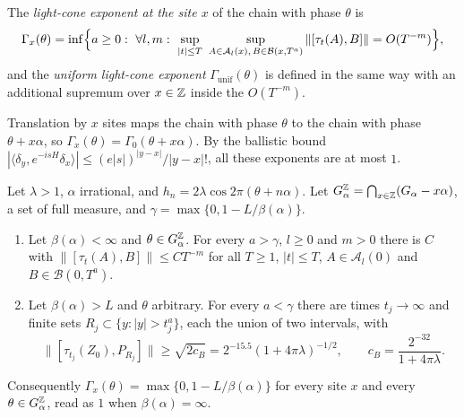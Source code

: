 \begin{definition}\label{def:LR}
The \emph{light-cone exponent at the site $x$} of the chain with phase $\theta$ is
\[
\Gamma_x(\theta)=\inf\Bigl\{a\ge0:\ \forall l,m:\ \sup_{|t|\le T}\ \sup_{A\in\mathcal A_l(x),\,B\in\mathcal B(x,T^a)}\|[\tau_t(A),B]\|=O(T^{-m})\Bigr\},
\]
and the \emph{uniform light-cone exponent} $\Gamma_{\mathrm{unif}}(\theta)$ is defined in the same way with an additional supremum over $x\in\mathbb Z$ inside the $O(T^{-m})$.
\end{definition}

Translation by $x$ sites maps the chain with phase $\theta$ to the chain with phase $\theta+x\alpha$, so $\Gamma_x(\theta)=\Gamma_0(\theta+x\alpha)$. By the ballistic bound $|\langle\delta_y,e^{-isH}\delta_x\rangle|\le(e|s|)^{|y-x|}/|y-x|!$, all these exponents are at most $1$.

\begin{theorem}\label{thm:LRfixed}
Let $\lambda>1$, $\alpha$ irrational, and $h_n=2\lambda\cos2\pi(\theta+n\alpha)$. Let $G_\alpha^\mathbb Z=\bigcap_{x\in\mathbb Z}(G_\alpha-x\alpha)$, a set of full measure, and $\gamma=\max\{0,1-L/\beta(\alpha)\}$.
\begin{enumerate}
\item Let $\beta(\alpha)<\infty$ and $\theta\in G_\alpha^\mathbb Z$. For every $a>\gamma$, $l\ge0$ and $m>0$ there is $C$ with $\|[\tau_t(A),B]\|\le CT^{-m}$ for all $T\ge1$, $|t|\le T$, $A\in\mathcal A_l(0)$ and $B\in\mathcal B(0,T^a)$.
\item Let $\beta(\alpha)>L$ and $\theta$ arbitrary. For every $a<\gamma$ there are times $t_j\to\infty$ and finite sets $R_j\subset\{y:|y|>t_j^a\}$, each the union of two intervals, with
\[
\bigl\|[\tau_{t_j}(Z_0),P_{R_j}]\bigr\|\ge\sqrt{2c_B}=2^{-15.5}(1+4\pi\lambda)^{-1/2},\qquad c_B=\frac{2^{-32}}{1+4\pi\lambda}.
\]
\end{enumerate}
Consequently $\Gamma_x(\theta)=\max\{0,1-L/\beta(\alpha)\}$ for every site $x$ and every $\theta\in G_\alpha^\mathbb Z$, read as $1$ when $\beta(\alpha)=\infty$.
\end{theorem}

